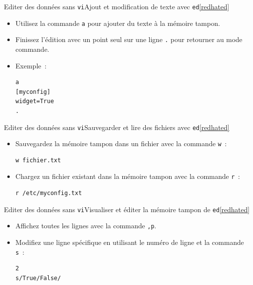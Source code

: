 \documentclass{beamer}
\begin{document}
    \begin{frame}[fragile]{Editer des données sans \lstinline{vi}}{Ajout et modification de texte avec \lstinline{ed}\cref{redhated}}
        \begin{itemize}
            \item Utilisez la commande \lstinline{a} pour ajouter du texte à la mémoire tampon.
            \item Finissez l'édition avec un point seul sur une ligne \lstinline{.} pour retourner au mode commande.
            \item Exemple~:
            \begin{lstlisting}
a
[myconfig]
widget=True
.
            \end{lstlisting}
        \end{itemize}
    \end{frame}

    \begin{frame}[fragile]{Editer des données sans \lstinline{vi}}{Sauvegarder et lire des fichiers avec \lstinline{ed}\cref{redhated}}
        \begin{itemize}
            \item Sauvegardez la mémoire tampon dans un fichier avec la commande \lstinline{w}~:
            \begin{lstlisting}
w fichier.txt
            \end{lstlisting}
            \item Chargez un fichier existant dans la mémoire tampon avec la commande \lstinline{r}~:
            \begin{lstlisting}
r /etc/myconfig.txt
            \end{lstlisting}
        \end{itemize}
    \end{frame}

    \begin{frame}[fragile]{Editer des données sans \lstinline{vi}}{Visualiser et éditer la mémoire tampon de \lstinline{ed}\cref{redhated}}
        \begin{itemize}
            \item Affichez toutes les lignes avec la commande \lstinline{,p}.
            \item Modifiez une ligne spécifique en utilisant le numéro de ligne et la commande \lstinline{s}~:
            \begin{lstlisting}
2
s/True/False/
            \end{lstlisting}
        \end{itemize}
    \end{frame}
\end{document}
